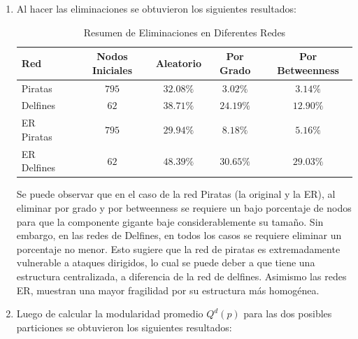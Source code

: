 \documentclass[12pt]{article}
\begin{document}
\begin{enumerate}
    \item Al hacer las eliminaciones se obtuvieron los siguientes resultados:
    \begin{table}[H]
        \footnotesize
        \centering
        \begin{tabular}{|l|c|c|c|c|}
            \hline
            \textbf{Red} & \textbf{Nodos Iniciales} & \textbf{Aleatorio} & \textbf{Por Grado} & \textbf{Por Betweenness} \\
            \hline
            Piratas & $795$ & $32.08\%$ & $3.02\%$ & $3.14\%$ \\
            \hline
            Delfines & $62$ & $38.71\%$ & $24.19\%$ & $12.90\%$ \\
            \hline
            ER Piratas & $795$ & $29.94\%$ & $8.18\%$ & $5.16\%$ \\
            \hline
            ER Delfines & $62$ & $48.39\%$ & $30.65\%$ & $29.03\%$ \\
            \hline
        \end{tabular}
        \caption{Resumen de Eliminaciones en Diferentes Redes}
        \label{tabla:resumen_eliminaciones}
    \end{table}
     Se puede observar que en el caso de la red Piratas (la original y la ER), al eliminar por grado y por betweenness se requiere un bajo porcentaje de nodos para que la componente gigante baje considerablemente su tamaño. Sin embargo, en las redes de Delfines, en todos los casos se requiere eliminar un porcentaje no menor. 
     Esto sugiere que la red de piratas es extremadamente vulnerable a ataques dirigidos, lo cual se puede deber a que tiene una estructura centralizada, a diferencia de la red de delfines. Asimismo las redes ER, muestran una mayor fragilidad por su estructura más homogénea.

    \item Luego de calcular la modularidad promedio $Q^{d}(p)$ para las dos posibles particiones se obtuvieron los siguientes resultados:
    

\end{enumerate}
\end{document}
